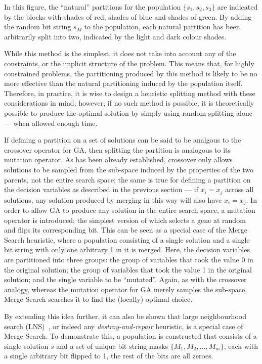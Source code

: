 \documentclass[journal]{IEEEtran}
\begin{document}
In this figure, the ``natural'' partitions for the population $\{s_1,s_2,s_3\}$ are indicated by the blocks with shades of red, shades of blue and shades of green. By adding the random bit string $s_M$ to the population, each natural partition has been arbitrarily split into two, indicated by the light and dark colour shades.

While this method is the simplest, it does not take into account any of the constraints, or the implicit structure of the problem. This means that, for highly constrained problems, the partitioning produced by this method is likely to be no more effective than the natural partitioning induced by the population itself. Therefore, in practice, it is wise to design a heuristic splitting method with these considerations in mind; however, if no such method is possible, it is theoretically possible to produce the optimal solution by simply using random splitting alone --- when allowed enough time.

\medskip

If defining a partition on a set of solutions can be said to be analgous to the crossover operator for GA, then splitting the partition is analogous to its mutation operator. As has been already established, crossover only allows solutions to be sampled from the sub-space induced by the properties of the two parents, not the entire search space; the same is true for defining a partition on the decision variables as described in the previous section --- if $x_i = x_j$ across all solutions, any solution produced by merging in this way will also have $x_i = x_j$. In order to allow GA to produce any solution in the entire search space, a mutation operator is introduced; the simplest version of which selects a gene at random and flips its corresponding bit. This can be seen as a special case of the Merge Search heuristic, where a population consisting of a single solution and a single bit string with only one arbitrary 1 in it is merged. Here, the decision variables are partitioned into three groups: the group of variables that took the value 0 in the original solution; the group of variables that took the value 1 in the original solution; and the single variable to be ``mutated''. Again, as with the crossover analogy, whereas the mutation operator for GA merely samples the sub-space, Merge Search searches it to find the (locally) optimal choice.

By extending this idea further, it can also be shown that large neighbourhood search (LNS)~\cite{Pisinger2010}, or indeed any \emph{destroy-and-repair} heuristic, is a special case of Merge Search. To demonstrate this, a population is constructed that consists of a single solution $s$ and a set of unique bit string masks $\{M_1,M_2,\dots,M_m\}$, each with a single arbitrary bit flipped to 1, the rest of the bits are all zeroes. 
\end{document}
